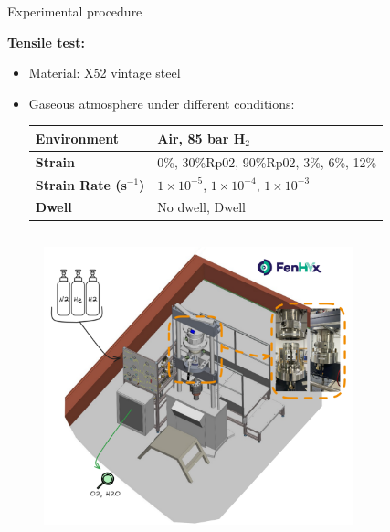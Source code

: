 \documentclass[9pt]{beamer}
\begin{document}
\begin{frame}{Experimental procedure}

\textbf{\textcolor{MINESBlue}{\large Tensile test:}}
\vspace{0.1cm}
\begin{itemize}
	\item Material: X52 vintage steel
	\vspace{0.1cm}
	\item Gaseous atmosphere under different conditions:
\vspace{0.1cm}
\begin{table}[ht!]
	\small
    \centering
    \renewcommand{\arraystretch}{1.5}
    \begin{tabular}{ll}
    \textbf{Environment}                 & Air, 85 bar H$_\text{2}$                               \\ \hline
    \textbf{Strain}                 & 0\%, 30\%Rp02, 90\%Rp02, 3\%, 6\%, 12\%             \\ \hline
    \textbf{Strain Rate (s$^{-1}$)} & $1\times10^{-5}$, $1\times10^{-4}$, $1\times10^{-3}$ \\ \hline
    \textbf{Dwell}                       & No dwell, Dwell                                     
    \end{tabular}
\end{table}
	
\end{itemize}

\begin{columns}

\begin{column}{0.49\textwidth}
	\begin{figure}
		\centering
		\includegraphics[width=0.8\textwidth]{Images/machine_fenhyx.pdf} \\
	\end{figure}
\end{column}


\end{columns}
\end{frame}
\end{document}
